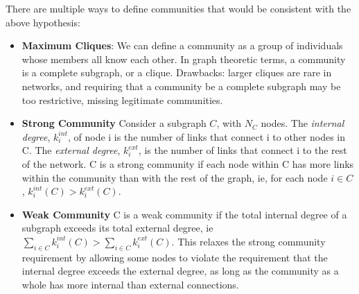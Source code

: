 \documentclass[11pt]{scrartcl} %
\begin{document}
There are multiple ways to define communities that would be consistent with the above hypothesis:
\begin{itemize}
	\item \textbf{Maximum Cliques}: We can define a community as a group of individuals whose members all know each other. In graph theoretic terms, a community is a complete subgraph, or a clique. Drawbacks: larger cliques are rare in networks, and requiring that a community be a complete subgraph may be too restrictive, missing legitimate communities.
	\item \textbf{Strong Community} Consider a subgraph $C$, with $N_C$ nodes. The \emph{internal degree}, $k_{i}^{int}$, of node i is the number of links that connect i to other nodes in C. The \emph{external degree}, $k_{i}^{ext}$, is the number of links that connect i to the rest of the network. C is a strong community if each node within C has more links within the community than with the rest of the graph, ie, for each node $i \in C$, $k_{i}^{int}(C) > k_{i}^{ext}(C)$.
	\item \textbf{Weak Community} C is a weak community if the total internal degree of a subgraph exceeds its total external degree, ie $\sum_{i \in C} k_{i}^{int}(C) > \sum_{i \in C} k_{i}^{ext}(C)$. This relaxes the strong community requirement by allowing some nodes to violate the requirement that the internal degree exceeds the external degree, as long as the community as a whole has more internal than external connections.
\end{itemize}

\paragraph{}
\paragraph{}
\paragraph{}
\paragraph{}
\textbf{}




\end{document}

